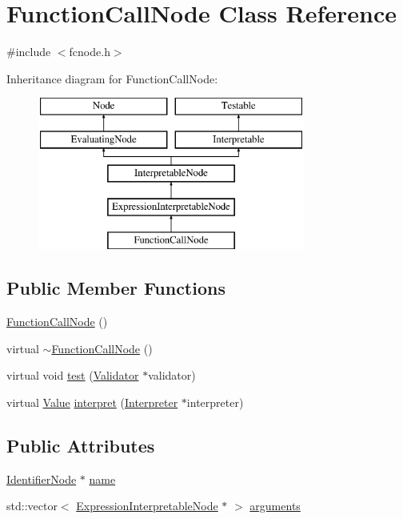 \hypertarget{classFunctionCallNode}{}\section{Function\+Call\+Node Class Reference}
\label{classFunctionCallNode}


{\ttfamily \#include $<$fcnode.\+h$>$}

Inheritance diagram for Function\+Call\+Node\+:\begin{figure}[H]
\begin{center}
\leavevmode
\includegraphics[height=5.000000cm]{classFunctionCallNode}
\end{center}
\end{figure}
\subsection*{Public Member Functions}
\begin{DoxyCompactItemize}
\item 
\hyperlink{classFunctionCallNode_af4c639d83ec4fc10ee4648277cedc134}{Function\+Call\+Node} ()
\item 
virtual \hyperlink{classFunctionCallNode_a781834ac40eada17d2f9dc53a8bd26e5}{$\sim$\+Function\+Call\+Node} ()
\item 
virtual void \hyperlink{classFunctionCallNode_a5a7f576984942e2e39057d716d8a5547}{test} (\hyperlink{classValidator}{Validator} $\ast$validator)
\item 
virtual \hyperlink{classValue}{Value} \hyperlink{classFunctionCallNode_a1d0d8806b7dd501ed43da58f77f7c49e}{interpret} (\hyperlink{classInterpreter}{Interpreter} $\ast$interpreter)
\end{DoxyCompactItemize}
\subsection*{Public Attributes}
\begin{DoxyCompactItemize}
\item 
\hyperlink{classIdentifierNode}{Identifier\+Node} $\ast$ \hyperlink{classFunctionCallNode_a03ebfc10277d6c6a7698b5eb0c02ac73}{name}
\item 
std\+::vector$<$ \hyperlink{classExpressionInterpretableNode}{Expression\+Interpretable\+Node} $\ast$ $>$ \hyperlink{classFunctionCallNode_a087579d1f0ece94640b4821830f72b55}{arguments}
\end{DoxyCompactItemize}
